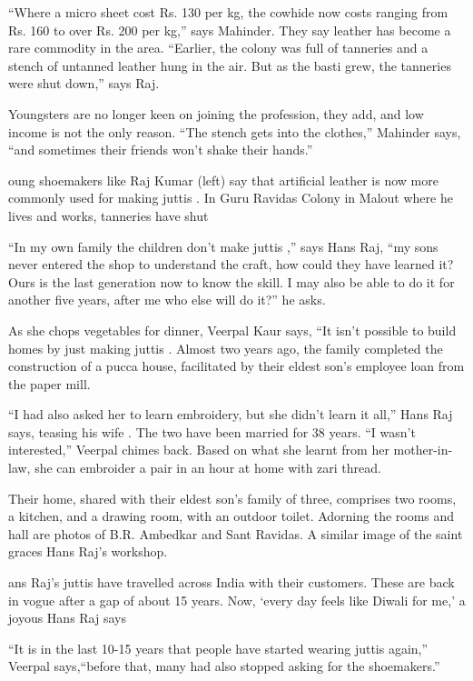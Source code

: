 \documentclass[
]{interact}
\begin{document}
``Where a micro sheet cost Rs. 130 per kg, the cowhide now costs ranging
from Rs. 160 to over Rs. 200 per kg,'' says Mahinder. They say leather
has become a rare commodity in the area. ``Earlier, the colony was full
of tanneries and a stench of untanned leather hung in the air. But as
the basti grew, the tanneries were shut down,'' says Raj.

Youngsters are no longer keen on joining the profession, they add, and
low income is not the only reason. ``The stench gets into the clothes,''
Mahinder says, ``and sometimes their friends won't shake their hands.''

oung shoemakers like Raj Kumar (left) say that artificial leather is now
more commonly used for making juttis . In Guru Ravidas Colony in Malout
where he lives and works, tanneries have shut

``In my own family the children don't make juttis ,'' says Hans Raj,
``my sons never entered the shop to understand the craft, how could they
have learned it? Ours is the last generation now to know the skill. I
may also be able to do it for another five years, after me who else will
do it?'' he asks.

As she chops vegetables for dinner, Veerpal Kaur says, ``It isn't
possible to build homes by just making juttis . Almost two years ago,
the family completed the construction of a pucca house, facilitated by
their eldest son's employee loan from the paper mill.

``I had also asked her to learn embroidery, but she didn't learn it
all,'' Hans Raj says, teasing his wife . The two have been married for
38 years. ``I wasn't interested,'' Veerpal chimes back. Based on what
she learnt from her mother-in-law, she can embroider a pair in an hour
at home with zari thread.

Their home, shared with their eldest son's family of three, comprises
two rooms, a kitchen, and a drawing room, with an outdoor toilet.
Adorning the rooms and hall are photos of B.R. Ambedkar and Sant
Ravidas. A similar image of the saint graces Hans Raj's workshop.

ans Raj's juttis have travelled across India with their customers. These
are back in vogue after a gap of about 15 years. Now, `every day feels
like Diwali for me,' a joyous Hans Raj says

``It is in the last 10-15 years that people have started wearing juttis
again,'' Veerpal says,``before that, many had also stopped asking for
the shoemakers.''
\end{document}
